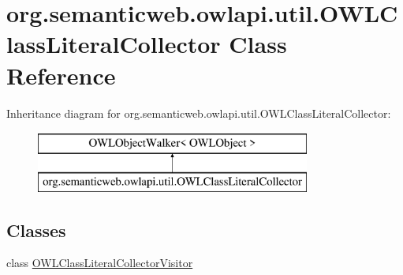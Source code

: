 \hypertarget{classorg_1_1semanticweb_1_1owlapi_1_1util_1_1_o_w_l_class_literal_collector}{\section{org.\-semanticweb.\-owlapi.\-util.\-O\-W\-L\-Class\-Literal\-Collector Class Reference}
\label{classorg_1_1semanticweb_1_1owlapi_1_1util_1_1_o_w_l_class_literal_collector}
}
Inheritance diagram for org.\-semanticweb.\-owlapi.\-util.\-O\-W\-L\-Class\-Literal\-Collector\-:\begin{figure}[H]
\begin{center}
\leavevmode
\includegraphics[height=2.000000cm]{classorg_1_1semanticweb_1_1owlapi_1_1util_1_1_o_w_l_class_literal_collector}
\end{center}
\end{figure}
\subsection*{Classes}
\begin{DoxyCompactItemize}
\item 
class \hyperlink{classorg_1_1semanticweb_1_1owlapi_1_1util_1_1_o_w_l_class_literal_collector_1_1_o_w_l_class_literal_collector_visitor}{O\-W\-L\-Class\-Literal\-Collector\-Visitor}
\end{DoxyCompactItemize}
